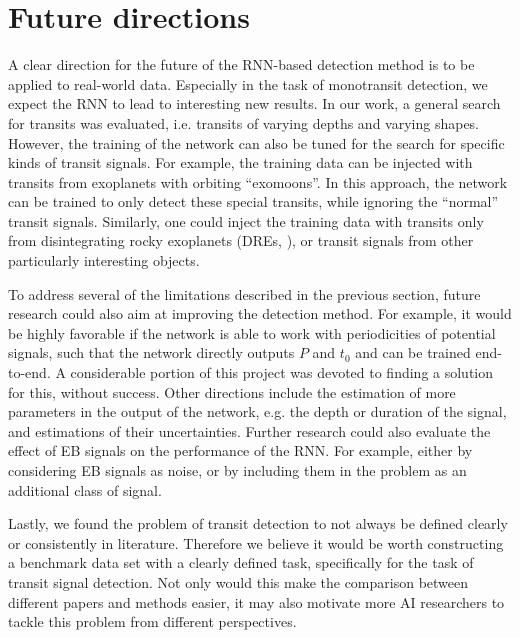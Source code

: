 
\section{Future directions}

A clear direction for the future of the RNN-based detection method is to be applied to real-world data. Especially in the task of monotransit detection, we expect the RNN to lead to interesting new results. In our work, a general search for transits was evaluated, i.e. transits of varying depths and varying shapes. However, the training of the network can also be tuned for the search for specific kinds of transit signals. For example, the training data can be injected with transits from exoplanets with orbiting ``exomoons''.  In this approach, the network can be trained to only detect these special transits, while ignoring the ``normal'' transit signals. Similarly, one could inject the training data with transits only from disintegrating rocky exoplanets (DREs, \citealp{rappaport2012possible}), or transit signals from other particularly interesting objects.

To address several of the limitations described in the previous section, future research could also aim at improving the detection method. For example, it would be highly favorable if the network is able to work with periodicities of potential signals, such that the network directly outputs $P$ and $t_0$ and can be trained end-to-end. A considerable portion of this project was devoted to finding a solution for this, without success.  Other directions include the
estimation of more parameters in the output of the network, e.g. the depth or duration of the signal, and estimations of their uncertainties. Further research could also evaluate the effect of EB signals on the performance of the RNN. For example, either by considering EB signals as noise, or by including them in the problem as an additional class of signal.

Lastly, we found the problem of transit detection to not always be defined clearly or consistently in literature.  Therefore we believe it would be worth constructing a benchmark data set with a clearly defined task, specifically for the task of transit signal detection. Not only would this make the comparison between different papers and methods easier, it may also motivate more AI researchers to tackle this problem from different perspectives.

